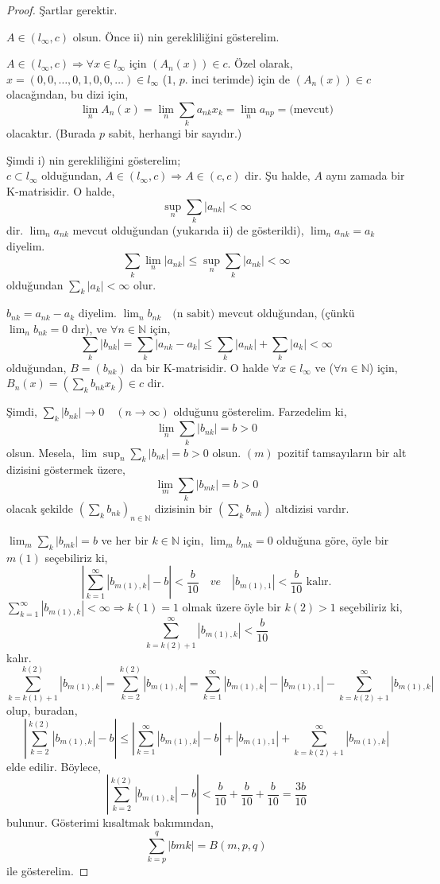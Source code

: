 \begin{proof}
Şartlar gerektir.

$A\in (l_\infty,c)$ olsun. Önce ii) nin gerekliliğini gösterelim.

$A\in (l_\infty,c)\Rightarrow\forall x\in l_\infty$ için $(A_n(x))\in c$. Özel olarak,\\ $x=(0,0,\ldots,0,1,0,0,\ldots)\in l_\infty$ ($1$, $p$. inci terimde) için de $(A_n(x))\in c$ olacağından, bu dizi için,
$$
\lim_nA_n(x)=\lim_n\sum\limits_ka_{nk}x_k=\lim_na_{np}=\text{(mevcut)}
$$
olacaktır. (Burada $p$ sabit, herhangi bir sayıdır.)

Şimdi i) nin gerekliliğini gösterelim;\\ $c\subset l_\infty$ olduğundan, $A\in (l_\infty, c)\Rightarrow A\in (c,c)$ dir. Şu halde, $A$ aynı zamada bir K-matrisidir. O halde,
$$
\sup_n\sum\limits_k|a_{nk}|<\infty
$$
dir. $\lim_na_{nk}$ mevcut olduğundan (yukarıda ii) de gösterildi), $\lim_na_{nk}=a_k$ diyelim.
$$
\sum\limits_k\lim_n|a_{nk}|\leq\sup_n\sum_k|a_{nk}|<\infty
$$
olduğundan $\sum_k|a_k|<\infty$ olur.

$b_{nk}=a_{nk}-a_k$ diyelim. $\lim_nb_{nk}\quad\text{(n sabit)}$ mevcut olduğundan, (çünkü $\lim_nb_{nk}=0$ dır), ve $\forall n\in\mathbb{N}$ için,
$$
\sum_k|b_{nk}|=\sum_k|a_{nk}-a_k|\leq\sum_k|a_{nk}|+\sum_k|a_k|<\infty
$$
olduğundan, $B=(b_{nk})$ da bir K-matrisidir. O halde $\forall x\in l_\infty$ ve ($\forall n\in\mathbb{N}$) için, $B_n(x)=\left(\sum\limits_kb_{nk}x_k\right)\in c$ dir.

Şimdi, $\sum\limits_k|b_{nk}|\to 0\quad(n\to\infty)$ olduğunu gösterelim. Farzedelim ki,\\
$$
\lim_n\sum_k|b_{nk}|= b>0
$$
olsun. Mesela, $\lim\sup_n\sum_k|b_{nk}|=b>0$
olsun. $(m)$ pozitif tamsayıların bir alt dizisini göstermek üzere,
$$
\lim_m\sum_k|b_{mk}|=b>0
$$
olacak şekilde $\left(\sum\limits_kb_{nk}\right)_{n\in\mathbb{N}}$ dizisinin bir $\left(\sum\limits_kb_{mk}\right)$ altdizisi vardır.

$\lim_m\sum\limits_k|b_{mk}|=b$ ve her bir $k\in\mathbb{N}$ için, $\lim_mb_{mk}=0$ olduğuna göre, öyle bir $m(1)$ seçebiliriz ki,
$$
\left|\sum\limits_{k=1}^\infty|b_{m(1),k}|-b\right|<\frac{b}{10}\quad{ve}\quad\left|b_{m(1),1}\right|<\frac{b}{10}\text{ kalır.}
$$
$\sum\limits_{k=1}^\infty|b_{m(1),k}|<\infty\Rightarrow k(1)=1$ olmak üzere öyle bir $k(2)>1$ seçebiliriz ki,
$$
\sum\limits_{k=k(2)+1}^\infty|b_{m(1),k}|<\frac{b}{10}
$$
kalır.
$$
\sum\limits_{k=k(1)+1}^{k(2)}|b_{m(1),k}|=\sum\limits_{k=2}^{k(2)}|b_{m(1),k}|=\sum\limits_{k=1}^\infty|b_{m(1),k}|-|b_{m(1),1}|-\sum\limits_{k=k(2)+1}^\infty|b_{m(1),k}|
$$
olup, buradan,
$$
\left|\sum\limits_{k=2}^{k(2)}|b_{m(1),k}|-b\right|\leq\left|\sum\limits_{k=1}^\infty|b_{m(1),k}|-b\right|+|b_{m(1),1}|+\sum\limits_{k=k(2)+1}^\infty|b_{m(1),k}|
$$
elde edilir. Böylece,
$$
\left|\sum\limits_{k=2}^{k(2)}|b_{m(1),k}|-b\right|<\frac{b}{10}+\frac{b}{10}+\frac{b}{10}=\frac{3b}{10}
$$
bulunur. Gösterimi kısaltmak bakımından, 
$$
\sum\limits_{k=p}^q|b{mk}|=B(m,p,q)
$$
ile gösterelim.


\end{proof}
